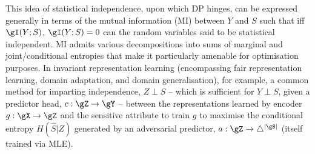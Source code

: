 %
%
This idea of statistical independence, upon which DP hinges, can be expressed generally in terms of
the mutual information (MI) between \(Y\) and \(S\) such that
iff \( \gI(Y;S)\), \( \gI(Y;S) = 0  \) can the random variables said to be statistical independent.
%
MI admits various decompositions into sums of marginal and joint/conditional entropies that make it
particularly amenable for optimisation purposes. 
%
In invariant representation learning (encompassing fair representation learning, domain adaptation,
and domain generalisation), for example, a common method for imparting independence, \(Z \perp S \)
-- which is sufficient for \(Y \perp S\), given a predictor head, \(c: \gZ \to \gY \) -- between
the representations learned by encoder \(g: \gX \to \gZ \) and the sensitive attribute to train
\(g\) to maximise the conditional entropy \( H(\hat{S}|Z) \) generated by an adversarial predictor,
\(a: \gZ \to \bigtriangleup^{|\gS|}\) (itself trained via MLE).

